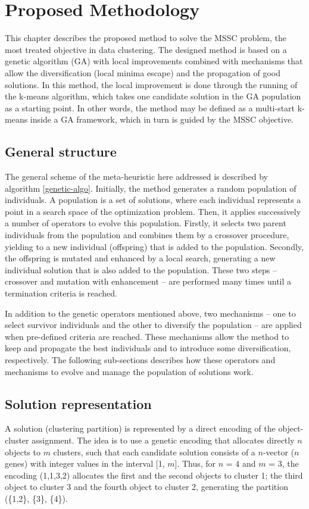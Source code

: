 \chapter{Proposed Methodology}
\label{chap:methodology}
This chapter describes the proposed method to solve the MSSC problem, the most treated objective in data clustering. The designed method is based on a genetic algorithm (GA) with local improvements combined with mechanisms that allow the diversification (local minima escape) and the propagation of good solutions. In this method, the local improvement is done through the running of the k-means algorithm, which takes one candidate solution in the GA population as a starting point. In other words, the method may be defined as a multi-start k-means inside a GA framework, which in turn is guided by the MSSC objective.

\section{General structure}
The general scheme of the meta-heuristic here addressed is described by algorithm \ref{genetic-algo}. Initially, the method generates a random population of individuals. A population is a set of solutions, where each individual represents a point in a search space of the optimization problem. Then, it applies successively a number of operators to evolve this population. Firstly, it selects two parent individuals from the population and combines them by a crossover procedure, yielding to a new individual (offspring) that is added to the population. Secondly, the offspring is mutated and enhanced by a local search, generating a new individual solution that is also added to the population. These two steps -- crossover and mutation with enhancement -- are performed many times until a termination criteria is reached.

In addition to the genetic operators mentioned above, two mechanisms -- one to select survivor individuals and the other to diversify the population -- are applied when pre-defined criteria are reached. These mechanisms allow the method to keep and propagate the best individuals and to introduce some diversification, respectively. The following sub-sections describes how these operators and mechanisms to evolve and manage the population of solutions work.

\section{Solution representation}
A solution (clustering partition) is represented by a direct encoding of the object-cluster assignment. The idea is to use a genetic encoding that allocates directly $n$ objects to $m$ clusters, such that each candidate solution consists of a $n$-vector ($n$ genes) with integer values in the interval [1, $m$]. Thus, for $n$ = 4 and $m$ = 3, the encoding (1,1,3,2) allocates the first and the second objects to cluster 1; the third object to cluster 3 and the fourth object to cluster 2, generating the partition (\{1,2\}, \{3\}, \{4\}).

